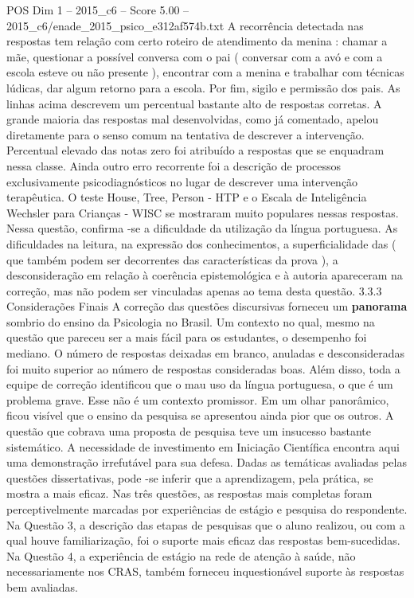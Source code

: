 \begin{textsample}{POS Dim 1 – 2015\_c6 – Score 5.00 – 2015\_c6/enade\_2015\_psico\_e312af574b.txt}
A recorrência detectada nas respostas tem relação com certo roteiro de atendimento da menina : chamar a mãe, questionar a possível conversa com o pai ( conversar com a avó e com a escola esteve ou não presente ), encontrar com a menina e trabalhar com técnicas lúdicas, dar algum retorno para a escola.
Por fim, sigilo e permissão dos pais.
As linhas acima descrevem um percentual bastante alto de respostas corretas.
A grande maioria das respostas mal desenvolvidas, como já comentado, apelou diretamente para o senso comum na tentativa de descrever a intervenção.
Percentual elevado das notas zero foi atribuído a respostas que se enquadram nessa classe.
Ainda outro erro recorrente foi a descrição de processos exclusivamente psicodiagnósticos no lugar de descrever uma intervenção terapêutica.
O teste House, Tree, Person - HTP e o Escala de Inteligência Wechsler para Crianças - WISC se mostraram muito populares nessas respostas.
Nessa questão, confirma -se a dificuldade da utilização da língua portuguesa.
As dificuldades na leitura, na expressão dos conhecimentos, a superficialidade das ( que também podem ser decorrentes das características da prova ), a desconsideração em relação à coerência epistemológica e à autoria apareceram na correção, mas não podem ser vinculadas apenas ao tema desta questão. 3.3.3 Considerações Finais A correção das questões discursivas forneceu um \textbf{panorama} sombrio do ensino da Psicologia no Brasil.
Um contexto no qual, mesmo na questão que pareceu ser a mais fácil para os estudantes, o desempenho foi mediano.
O número de respostas deixadas em branco, anuladas e desconsideradas foi muito superior ao número de respostas consideradas boas.
Além disso, toda a equipe de correção identificou que o mau uso da língua portuguesa, o que é um problema grave.
Esse não é um contexto promissor.
Em um olhar panorâmico, ficou visível que o ensino da pesquisa se apresentou ainda pior que os outros.
A questão que cobrava uma proposta de pesquisa teve um insucesso bastante sistemático.
A necessidade de investimento em Iniciação Científica encontra aqui uma demonstração irrefutável para sua defesa.
Dadas as temáticas avaliadas pelas questões dissertativas, pode -se inferir que a aprendizagem, pela prática, se mostra a mais eficaz.
Nas três questões, as respostas mais completas foram perceptivelmente marcadas por experiências de estágio e pesquisa do respondente.
Na Questão 3, a descrição das etapas de pesquisas que o aluno realizou, ou com a qual houve familiarização, foi o suporte mais eficaz das respostas bem-sucedidas.
Na Questão 4, a experiência de estágio na rede de atenção à saúde, não necessariamente nos CRAS, também forneceu inquestionável suporte às respostas bem avaliadas.

\end{textsample}
